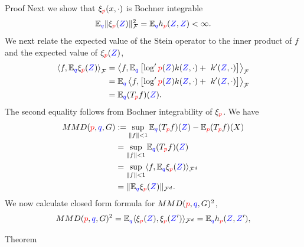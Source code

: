 \begin{frame}
\begin{columns}
\begin{column}{.33\linewidth}
\begin{block}{Proof}
Next we show that $\xi_{{ \color{red} p}}(x,\cdot)$ is Bochner integrable
\[
\mathbb{E}_{{ \color{blue} q}}\|\xi_{{ \color{red} p}}({ \color{blue} Z})\|_{\mathcal{F}}^{2}=\mathbb{E}_{{ \color{blue} q}}h_{{ \color{red} p}}({ \color{blue} Z},{ \color{blue} Z})<\infty.
\]
We next relate the expected value of the Stein operator to the inner product of $f$ and the expected value
of $\xi_{{ \color{red} p}}({ \color{blue} Z})$,  
\begin{align*}
  \left\langle f,\mathbb{E}_{{ \color{blue} q}} \xi_{{ \color{red} p}}({ \color{blue} Z}) \right\rangle _{\mathcal{F}}& =\left\langle f,\mathbb{E}_{{ \color{blue} q}} \left[  \log' { \color{red} p}({ \color{blue} Z}) k({ \color{blue} Z},\cdot)+\ k'({ \color{blue} Z},\cdot) \right] \right \rangle _{\mathcal{F}}\\
 & = \mathbb{E}_{{ \color{blue} q}}  \left\langle f,\left[  \log' { \color{red} p}({ \color{blue} Z}) k({ \color{blue} Z},\cdot)+\ k'({ \color{blue} Z},\cdot) \right] \right \rangle _{\mathcal{F}}\\
 & =\mathbb{E}_{{ \color{blue} q}}(T_{{ \color{red} p}}f)({ \color{blue} Z}).
\end{align*}
The second equality follows from  Bochner integrability of $\xi_{{ \color{red} p}}$.
We have 
\begin{align*}
MMD({ \color{red} p},{ \color{blue} q},G) & :=\sup_{\Vert f\Vert<1}\mathbb{E}_{{ \color{blue} q}}(T_{{ \color{red} p}}f)({ \color{blue} Z})-\mathbb{E}_{{ \color{red} p}}(T_{{ \color{red} p}}f)(X)\\
 & =\sup_{\Vert f\Vert<1}\mathbb{E}_{{ \color{blue} q}}(T_{{ \color{red} p}}f)({ \color{blue} Z})\\
 & =\sup_{\Vert f\Vert<1}\langle f,\mathbb{E}_{{ \color{blue} q}}\xi_{{ \color{red} p}}({ \color{blue} Z})\rangle_{{\cal F}^{d}}\\
 & =\|\mathbb{E}_{{ \color{blue} q}}\xi_{{ \color{red} p}}({ \color{blue} Z})\|_{\mathcal{F}^{d}}.
\end{align*}
We now calculate closed form formula for $MMD({ \color{red} p},{ \color{blue} q},G)^{2}$,
\begin{align*}
MMD({ \color{red} p},{ \color{blue} q},G)^{2}  =\mathbb{E}_{{ \color{blue} q}}\langle\xi_{{ \color{red} p}}({ \color{blue} Z}),\xi_{{ \color{red} p}}({ \color{blue} Z}')\rangle_{\mathcal{F}^{d}}=\mathbb{E}_{{ \color{blue} q}}h_{{ \color{red} p}}({ \color{blue} Z},{ \color{blue} Z}'),
\end{align*}
\end{block}


\vspace{-0.75cm}
\begin{block}{Theorem}
\vspace{1cm}



\end{block}
\end{column}
\end{columns}
\end{frame}
